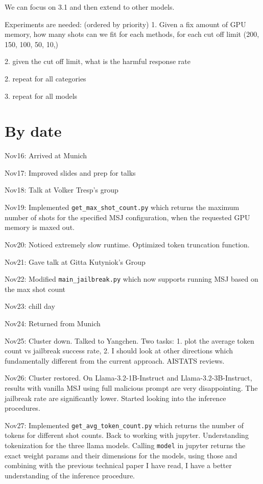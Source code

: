 We can focus on 3.1 and then extend to other models.


Experiments are needed: (ordered by priority)
1. Given a fix amount of GPU memory, how many shots can we fit for each methods, for each cut off limit (200, 150, 100, 50, 10,)

2. given the cut off limit, what is the harmful response rate 

2. repeat for all categories

3. repeat for all models

\section{By date}
Nov16: Arrived at Munich

Nov17: Improved slides and prep for talks

Nov18: Talk at Volker Tresp's group

Nov19: Implemented \texttt{get\_max\_shot\_count.py} which returns the maximum number of shots for the specified MSJ configuration, when the requested GPU memory is maxed out.

Nov20: Noticed extremely slow runtime. Optimized token truncation function.

Nov21: Gave talk at Gitta Kutyniok's Group

Nov22: Modified \texttt{main\_jailbreak.py} which now supports running MSJ based on the max shot count

Nov23: chill day

Nov24: Returned from Munich

Nov25: Cluster down. Talked to Yangchen. Two tasks: 1. plot the average token count vs jailbreak success rate, 2. I should look at other directions which fundamentally different from the current approach. AISTATS reviews.

Nov26: Cluster restored. On Llama-3.2-1B-Instruct and Llama-3.2-3B-Instruct, results with vanilla MSJ using full malicious prompt are very disappointing. The jailbreak rate are significantly lower. Started looking into the inference procedures. 

Nov27: Implemented \texttt{get\_avg\_token\_count.py} which returns the number of tokens for different shot counts. Back to working with jupyter. Understanding tokenization for the three llama models. Calling \texttt{model} in jupyter returns the exact weight params and their dimensions for the models, using those and combining with the previous technical paper I have read, I have a better understanding of the inference procedure.

